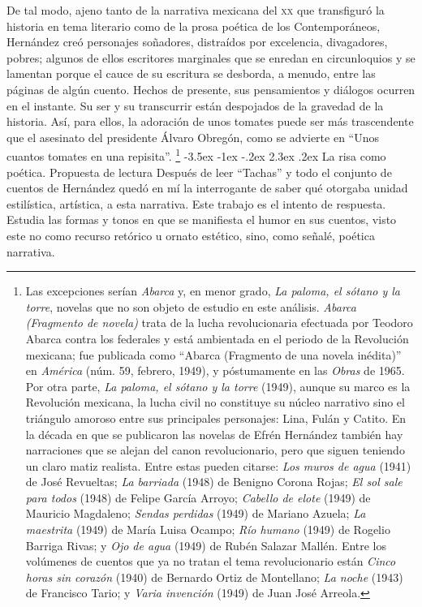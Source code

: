\documentclass[14pt,twoside,final]{extbook} %
\makeatletter
\let\oldfootnote\footnote
\renewcommand\footnote[1]{%
\oldfootnote{\hspace{1mm}#1}}
\renewcommand\section{\@startsection {section}{1}{\z@}%
                                     {-3.5ex \@plus -1ex \@minus -.2ex}%
                                     {2.3ex \@plus .2ex}%
                                     {\normalfont\large\bfseries\sc}}
\makeatother
\begin{document}
De tal modo, ajeno tanto de la narrativa mexicana del \textsc{xx} que transfiguró la historia en tema literario como de la prosa poética de los Contemporáneos, Hernández creó personajes soñadores, distraídos por excelencia, divagadores, pobres; algunos de ellos escritores marginales que se enredan en circunloquios y se lamentan porque el cauce de su escritura se desborda, a menudo, entre las páginas de algún cuento. Hechos de presente, sus pensamientos y diálogos ocurren en el instante. Su ser y su transcurrir están despojados de la gravedad de la historia. Así, para ellos, la adoración de unos tomates puede ser más trascendente que el asesinato del presidente Álvaro Obregón, como se advierte en ``Unos cuantos tomates en una repisita''.\footnote{Las excepciones serían \emph{Abarca} y, en menor grado, \emph{La paloma, el sótano y la torre}, novelas que no son objeto de estudio en este análisis. \emph{Abarca (Fragmento de novela)} trata de la lucha revolucionaria efectuada por Teodoro Abarca contra los federales y está ambientada en el periodo de la Revolución mexicana; fue publicada como ``Abarca (Fragmento de una novela inédita)'' en \emph{América} (núm. 59, febrero, 1949), y póstumamente en las \emph{Obras} de 1965. Por otra parte, \emph{La paloma, el sótano y la torre} (1949), aunque su marco es la Revolución mexicana, la lucha civil no constituye su núcleo narrativo sino el triángulo amoroso entre sus principales personajes: Lina, Fulán y Catito. En la década en que se publicaron las novelas de Efrén Hernández también hay narraciones que se alejan del canon revolucionario, pero que siguen teniendo un claro matiz realista. Entre estas pueden citarse: \emph{Los muros de agua} (1941) de José Revueltas; \emph{La barriada} (1948) de Benigno Corona Rojas; \emph{El sol sale para todos} (1948) de Felipe García Arroyo; \emph{Cabello de elote} (1949) de Mauricio Magdaleno; \emph{Sendas perdidas} (1949) de Mariano Azuela; \emph{La maestrita} (1949) de María Luisa Ocampo; \emph{Río humano} (1949) de Rogelio Barriga Rivas; y \emph{Ojo de agua} (1949) de Rubén Salazar Mallén. Entre los volúmenes de cuentos que ya no tratan el tema revolucionario están \emph{Cinco horas sin corazón} (1940) de Bernardo Ortiz de Montellano; \emph{La noche} (1943) de Francisco Tario; y \emph{Varia invención} (1949) de Juan José Arreola.}
\section{La risa como poética. Propuesta de lectura}\label{sec:la-risa-como-poetica-propuesta-de-lectura}\protect\enlargethispage*{\baselineskip}
Después de leer ``Tachas'' y todo el conjunto de cuentos de Hernández quedó en mí la interrogante de saber qué otorgaba unidad estilística, artística, a esta narrativa. Este trabajo es el intento de respuesta. Estudia las formas y tonos en que se manifiesta el humor en sus cuentos, visto este no como recurso retórico u ornato estético, sino, como señalé, poética narrativa.
\end{document}
